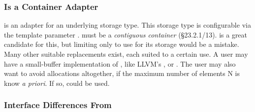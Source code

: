 \subsubsection{ Is a Container Adapter}

 is an adapter for an underlying storage type.  This storage
type is configurable via the template parameter .
 must be a \textit{contiguous container} (\S23.2.1/13).
 is a great candidate for this, but limiting  only
to use  for its storage would be a mistake.  Many other suitable
replacements exist, each suited to a certain use.  A user may have a
small-buffer implementation of , like LLVM's ,
or .  The user may also want to avoid
allocations altogether, if the maximum number of elements N is know \textit{a
  priori}.  If so,  could be used.

\subsubsection{Interface Differences From }

